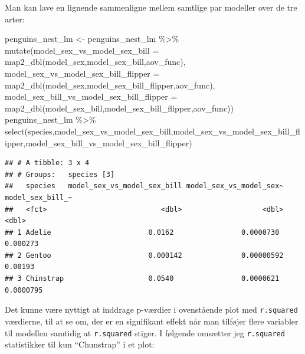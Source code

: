 \documentclass[
]{book}
\newenvironment{Shaded}{\begin{snugshade}}{\end{snugshade}}
\newcommand{\AttributeTok}[1]{\textcolor[rgb]{0.77,0.63,0.00}{#1}}
\newcommand{\FunctionTok}[1]{\textcolor[rgb]{0.00,0.00,0.00}{#1}}
\newcommand{\NormalTok}[1]{#1}
\newcommand{\OtherTok}[1]{\textcolor[rgb]{0.56,0.35,0.01}{#1}}
\newcommand{\SpecialCharTok}[1]{\textcolor[rgb]{0.00,0.00,0.00}{#1}}
\begin{document}
Man kan lave en lignende sammenligne mellem samtlige par modeller over de tre arter:

\begin{Shaded}
\begin{Highlighting}[]
\NormalTok{penguins\_nest\_lm }\OtherTok{\textless{}{-}}\NormalTok{  penguins\_nest\_lm }\SpecialCharTok{\%\textgreater{}\%}
  \FunctionTok{mutate}\NormalTok{(}\AttributeTok{model\_sex\_vs\_model\_sex\_bill =}              \FunctionTok{map2\_dbl}\NormalTok{(model\_sex,model\_sex\_bill,aov\_func),}
         \AttributeTok{model\_sex\_vs\_model\_sex\_bill\_flipper =}      \FunctionTok{map2\_dbl}\NormalTok{(model\_sex,model\_sex\_bill\_flipper,aov\_func),}
         \AttributeTok{model\_sex\_bill\_vs\_model\_sex\_bill\_flipper =} \FunctionTok{map2\_dbl}\NormalTok{(model\_sex\_bill,model\_sex\_bill\_flipper,aov\_func))}
\NormalTok{penguins\_nest\_lm }\SpecialCharTok{\%\textgreater{}\%} \FunctionTok{select}\NormalTok{(species,model\_sex\_vs\_model\_sex\_bill,model\_sex\_vs\_model\_sex\_bill\_flipper,model\_sex\_bill\_vs\_model\_sex\_bill\_flipper)}
\end{Highlighting}
\end{Shaded}

\begin{verbatim}
## # A tibble: 3 x 4
## # Groups:   species [3]
##   species   model_sex_vs_model_sex_bill model_sex_vs_model_sex~ model_sex_bill_~
##   <fct>                           <dbl>                   <dbl>            <dbl>
## 1 Adelie                       0.0162                0.0000730         0.000273 
## 2 Gentoo                       0.000142              0.00000592        0.00193  
## 3 Chinstrap                    0.0540                0.0000621         0.0000795
\end{verbatim}

Det kunne være nyttigt at inddrage p-værdier i ovenstående plot med \texttt{r.squared} værdierne, til at se om, der er en signifikant effekt når man tilføjer flere variabler til modellen samtidig at \texttt{r.squared} stiger. I følgende omsætter jeg \texttt{r.squared} statistikker til kun ``Chunstrap'' i et plot:
\end{document}
